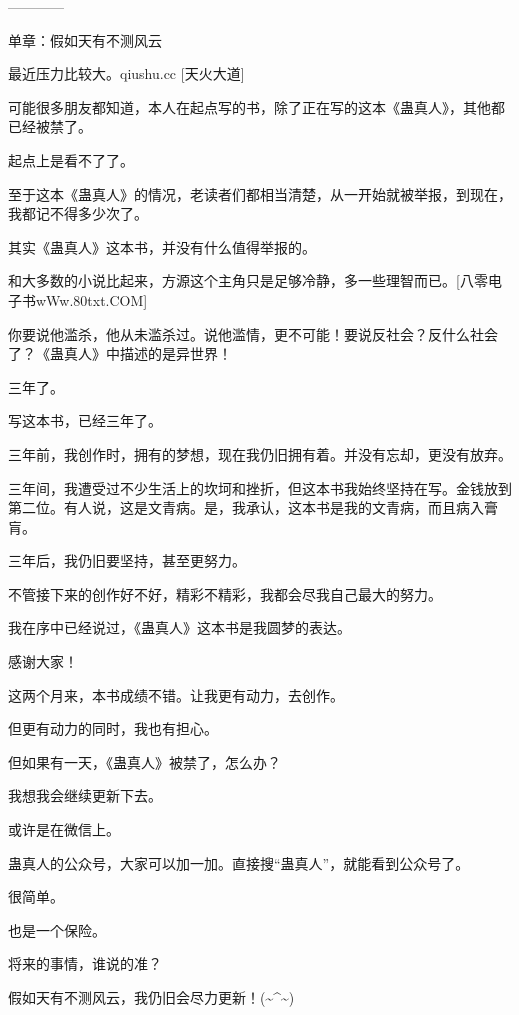 \begin{this_body}
------------

单章：假如天有不测风云

最近压力比较大。qiushu.cc [天火大道]

可能很多朋友都知道，本人在起点写的书，除了正在写的这本《蛊真人》，其他都已经被禁了。

起点上是看不了了。

至于这本《蛊真人》的情况，老读者们都相当清楚，从一开始就被举报，到现在，我都记不得多少次了。

其实《蛊真人》这本书，并没有什么值得举报的。

和大多数的小说比起来，方源这个主角只是足够冷静，多一些理智而已。[八零电子书wWw.80txt.COM]

你要说他滥杀，他从未滥杀过。说他滥情，更不可能！要说反社会？反什么社会了？《蛊真人》中描述的是异世界！

三年了。

写这本书，已经三年了。

三年前，我创作时，拥有的梦想，现在我仍旧拥有着。并没有忘却，更没有放弃。

三年间，我遭受过不少生活上的坎坷和挫折，但这本书我始终坚持在写。金钱放到第二位。有人说，这是文青病。是，我承认，这本书是我的文青病，而且病入膏肓。

三年后，我仍旧要坚持，甚至更努力。

不管接下来的创作好不好，精彩不精彩，我都会尽我自己最大的努力。

我在序中已经说过，《蛊真人》这本书是我圆梦的表达。

感谢大家！

这两个月来，本书成绩不错。让我更有动力，去创作。

但更有动力的同时，我也有担心。

但如果有一天，《蛊真人》被禁了，怎么办？

我想我会继续更新下去。

或许是在微信上。

蛊真人的公众号，大家可以加一加。直接搜“蛊真人”，就能看到公众号了。

很简单。

也是一个保险。

将来的事情，谁说的准？

假如天有不测风云，我仍旧会尽力更新！(\~{}\^{}\~{})

\end{this_body}

